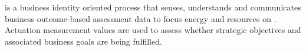 \textbf{} is a business identity oriented
process that senses, understands and communicates business outcome-based assessment data to focus energy and
resources on .
Actuation measurement values are used to assess whether strategic objectives and associated
business goals are being fulfilled.